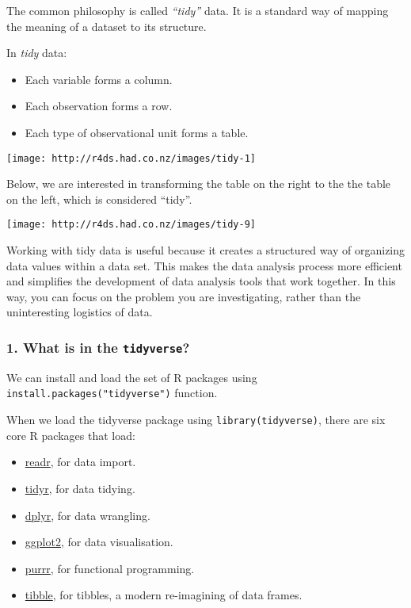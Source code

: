 \documentclass[]{article}
\providecommand{\tightlist}{%
  \setlength{\itemsep}{0pt}\setlength{\parskip}{0pt}}
\begin{document}
The common philosophy is called \emph{``tidy''} data. It is a standard
way of mapping the meaning of a dataset to its structure.

In \emph{tidy} data:

\begin{itemize}
\tightlist
\item
  Each variable forms a column.
\item
  Each observation forms a row.
\item
  Each type of observational unit forms a table.
\end{itemize}

\texttt{[image: http://r4ds.had.co.nz/images/tidy-1]}

Below, we are interested in transforming the table on the right to the
the table on the left, which is considered ``tidy''.

\texttt{[image: http://r4ds.had.co.nz/images/tidy-9]}

Working with tidy data is useful because it creates a structured way of
organizing data values within a data set. This makes the data analysis
process more efficient and simplifies the development of data analysis
tools that work together. In this way, you can focus on the problem you
are investigating, rather than the uninteresting logistics of data.

\hypertarget{what-is-in-the-tidyverse}{%
\subsubsection{\texorpdfstring{1. What is in the
\texttt{tidyverse}?}{1. What is in the tidyverse?}}\label{what-is-in-the-tidyverse}}

We can install and load the set of R packages using
\texttt{install.packages("tidyverse")} function.

When we load the tidyverse package using \texttt{library(tidyverse)},
there are six core R packages that load:

\begin{itemize}
\tightlist
\item
  \href{http://readr.tidyverse.org}{readr}, for data import.
\item
  \href{http://tidyr.tidyverse.org}{tidyr}, for data tidying.
\item
  \href{http://dplyr.tidyverse.org}{dplyr}, for data wrangling.
\item
  \href{http://ggplot2.tidyverse.org}{ggplot2}, for data visualisation.
\item
  \href{http://purrr.tidyverse.org}{purrr}, for functional programming.
\item
  \href{http://tibble.tidyverse.org}{tibble}, for tibbles, a modern
  re-imagining of data frames.
\end{itemize}
\end{document}

